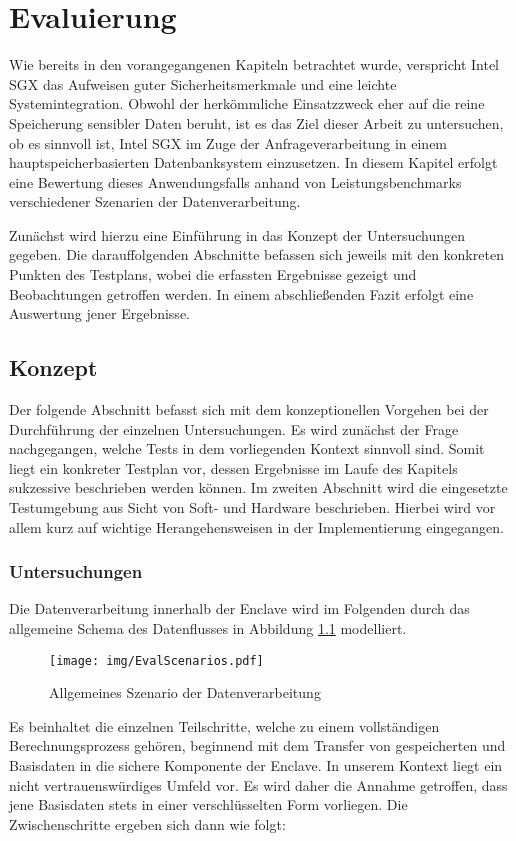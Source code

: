 \chapter{Evaluierung}

Wie bereits in den vorangegangenen Kapiteln betrachtet wurde, verspricht Intel \ac{SGX} das Aufweisen guter Sicherheitsmerkmale und eine leichte Systemintegration. Obwohl der herkömmliche Einsatzzweck eher auf die reine Speicherung sensibler Daten beruht, ist es das Ziel dieser Arbeit zu untersuchen, ob es sinnvoll ist, Intel \ac{SGX} im Zuge der Anfrageverarbeitung in einem hauptspeicherbasierten Datenbanksystem einzusetzen. In diesem Kapitel erfolgt eine Bewertung dieses Anwendungsfalls anhand von Leistungsbenchmarks verschiedener Szenarien der Datenverarbeitung.

Zunächst wird hierzu eine Einführung in das Konzept der Untersuchungen gegeben. Die darauffolgenden Abschnitte befassen sich jeweils mit den konkreten Punkten des Testplans, wobei die erfassten Ergebnisse gezeigt und Beobachtungen getroffen werden. In einem abschließenden Fazit erfolgt eine Auswertung jener Ergebnisse.

\section{Konzept}

Der folgende Abschnitt befasst sich mit dem konzeptionellen Vorgehen bei der Durchführung der einzelnen Untersuchungen. Es wird zunächst der Frage nachgegangen, welche Tests in dem vorliegenden Kontext sinnvoll sind. Somit liegt ein konkreter Testplan vor, dessen Ergebnisse im Laufe des Kapitels sukzessive beschrieben werden können. Im zweiten Abschnitt wird die eingesetzte Testumgebung aus Sicht von Soft- und Hardware beschrieben. Hierbei wird vor allem kurz auf wichtige Herangehensweisen in der Implementierung eingegangen.

\subsection{Untersuchungen}

Die Datenverarbeitung innerhalb der Enclave wird im Folgenden durch das allgemeine Schema des Datenflusses in Abbildung \ref{fig:scenarios} modelliert.
\begin{figure}[h]
	\texttt{[image: img/EvalScenarios.pdf]}
	\centering
	\caption{Allgemeines Szenario der Datenverarbeitung}
	\label{fig:scenarios}
\end{figure} 
Es beinhaltet die einzelnen Teilschritte, welche zu einem vollständigen Berechnungsprozess gehören, beginnend mit dem Transfer von gespeicherten und Basisdaten in die sichere Komponente der Enclave. In unserem Kontext liegt ein nicht vertrauenswürdiges Umfeld vor. Es wird daher die Annahme getroffen, dass jene Basisdaten stets in einer verschlüsselten Form vorliegen. Die Zwischenschritte ergeben sich dann wie folgt:

